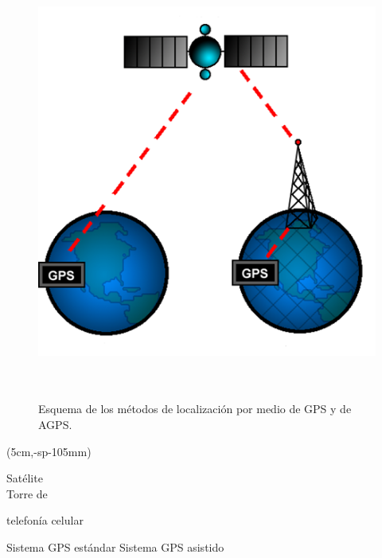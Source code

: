 \begin{figure}[H]
\centering
\includegraphics[scale=0.7]{a_gps2.png}
\ \\
\ \\
\caption[Caption for LOF]{Esquema de los métodos de localización por medio de GPS y de AGPS\footnotemark[1].}
\label{figura3}
\end{figure}

\begin{textblock*}{\textwidth}(5cm,\dimexpr\paperheight-sp-105mm)
\small{\hspace{5cm} {\selectfont Satélite} \\

\vspace{3cm}
\hspace{8.8cm} {\selectfont Torre de}

\hspace{8.3cm} {\selectfont telefonía celular}

\vspace{3.8cm}
\hspace{1.1cm} {\selectfont Sistema GPS estándar} \hspace{1.3cm} {\selectfont Sistema GPS asistido}}
\end{textblock*}

